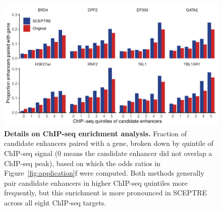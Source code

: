 \documentclass{nature}
\begin{document}
 \clearpage
 \thispagestyle{empty} 
\begin{figure}[h!]
	\includegraphics[width = \textwidth]{figures/FigureS3/FigureS3.pdf}
	\caption{\textbf{Details on ChIP-seq enrichment analysis.} Fraction of candidate enhancers paired with a gene, broken down by quintile of ChIP-seq signal (0 means the candidate enhancer did not overlap a ChIP-seq peak), based on which the odds ratios in Figure~\ref{fig:application}f were computed. Both methods generally pair candidate enhancers in higher ChIP-seq quintiles more frequently, but this enrichment is more pronounced in SCEPTRE across all eight ChIP-seq targets.}
	\label{fig:chipseq-enrichment-details}
 \end{figure}
\end{document}
